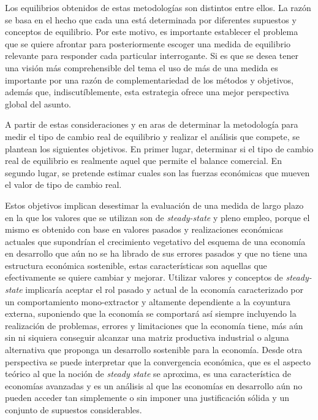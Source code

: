 \documentclass[12pt,letterpaper]{article}
\begin{document}
Los equilibrios obtenidos de estas metodologías son distintos entre ellos. La razón se basa en el hecho que cada una está determinada por diferentes supuestos y conceptos de equilibrio. Por este motivo, es importante establecer el problema que se quiere afrontar para posteriormente escoger una medida de equilibrio relevante para responder cada particular interrogante. Si es que se desea tener una visión más comprehensible del tema el uso de más de una medida es importante por una razón de complementariedad de los métodos y objetivos, además que, indiscutíblemente, esta estrategia ofrece una mejor perspectiva global del asunto.


A partir de estas consideraciones y en aras de determinar la metodología para medir el tipo de cambio real de equilibrio y realizar el análisis que compete, se plantean los siguientes objetivos. En primer lugar, determinar si el tipo de cambio real de equilibrio es realmente aquel que permite el balance comercial. En segundo lugar, se pretende estimar cuales son las fuerzas económicas que mueven el valor de tipo de cambio real. 

Estos objetivos implican desestimar la evaluación de una medida de largo plazo en la que los valores que se utilizan son de \emph{steady-state} y pleno empleo, porque el mismo es obtenido con base en valores pasados y realizaciones económicas actuales que supondrían el crecimiento vegetativo del esquema de una economía en desarrollo que aún no se ha librado de sus errores pasados y que no tiene una estructura económica sostenible, estas características son aquellas que efectivamente se quiere cambiar y mejorar. Utilizar valores y conceptos de \emph{steady-state} implicaría aceptar el rol pasado y actual de la economía caracterizado por un comportamiento mono-extractor y altamente dependiente a la coyuntura externa, suponiendo que la economía se comportará así siempre incluyendo la realización de problemas, errores y limitaciones que la economía tiene, más aún sin ni siquiera conseguir alcanzar una matriz productiva industrial o alguna alternativa que proponga un desarrollo sostenible para la economía. Desde otra perspectiva se puede interpretar que la convergencia económica, que es el aspecto teórico al que la noción de \emph{steady state} se aproxima, es una característica de economías avanzadas y es un análisis al que las economías en desarrollo aún no pueden acceder tan simplemente o sin imponer una justificación sólida y un conjunto de supuestos considerables.
\end{document}
